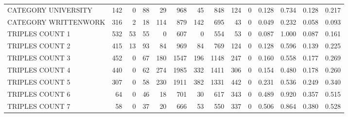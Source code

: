 \begin{tabular}{lrrrrrrrrrllll}
 CATEGORY UNIVERSITY      &             142 &             0 &              88 &              29 &             968 &   45 &  848 &  124 &    0 & 0.128 & 0.734 & 0.128 & 0.217 \\
 CATEGORY WRITTENWORK     &             316 &             2 &              18 &             114 &             879 &  142 &  695 &   43 &    0 & 0.049 & 0.232 & 0.058 & 0.093 \\
 TRIPLES COUNT 1          &             532 &            53 &              55 &               0 &             607 &    0 &  554 &   53 &    0 & 0.087 & 1.000 & 0.087 & 0.161 \\
 TRIPLES COUNT 2          &             415 &            13 &              93 &              84 &             969 &   84 &  769 &  124 &    0 & 0.128 & 0.596 & 0.139 & 0.225 \\
 TRIPLES COUNT 3          &             452 &             0 &              67 &             180 &            1547 &  196 & 1148 &  247 &    0 & 0.160 & 0.558 & 0.177 & 0.269 \\
 TRIPLES COUNT 4          &             440 &             0 &              62 &             274 &            1985 &  332 & 1411 &  306 &    0 & 0.154 & 0.480 & 0.178 & 0.260 \\
 TRIPLES COUNT 5          &             307 &             0 &              58 &             230 &            1911 &  382 & 1331 &  442 &    0 & 0.231 & 0.536 & 0.249 & 0.340 \\
 TRIPLES COUNT 6          &              64 &             0 &              46 &              18 &             701 &   30 &  617 &  343 &    0 & 0.489 & 0.920 & 0.357 & 0.515 \\
 TRIPLES COUNT 7          &              58 &             0 &              37 &              20 &             666 &   53 &  550 &  337 &    0 & 0.506 & 0.864 & 0.380 & 0.528 \\
\hline
\end{tabular}